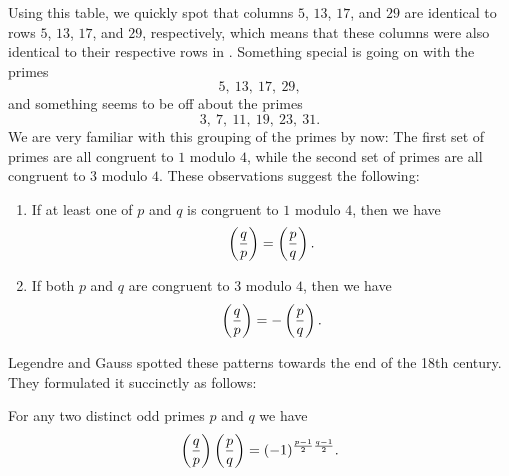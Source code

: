 Using this table, we quickly spot that columns $5$, $13$, $17$, and $29$ are identical to rows $5$, $13$, $17$, and $29$, respectively, which means that these columns were also identical to their respective rows in . Something special is going on with the primes
\begin{equation*}
  5,~13,~17,~29,
\end{equation*}
and something seems to be off about the primes
\begin{equation*}
  3,~7,~11,~19,~23,~31.
\end{equation*}
We are very familiar with this grouping of the primes by now: The first set of primes are all congruent to $1$ modulo $4$, while the second set of primes are all congruent to $3$ modulo $4$. These observations suggest the following:
\begin{enumerate}
\item If at least one of $p$ and $q$ is congruent to $1$ modulo $4$, then we have
  \begin{equation*}
    \legendre{q}{p}=\legendre{p}{q}.
  \end{equation*}
\item If both $p$ and $q$ are congruent to $3$ modulo $4$, then we have
  \begin{equation*}
    \legendre{q}{p}=-\legendre{p}{q}.
  \end{equation*}
\end{enumerate}
Legendre and Gauss spotted these patterns towards the end of the 18th century. They formulated it succinctly as follows:

\begin{theorem}\label{theorem:quadratic-reciprocity}
  For any two distinct odd primes $p$ and $q$ we have
  \begin{equation*}
    \legendre{q}{p}\legendre{p}{q}=(-1)^{\frac{p-1}{2}\frac{q-1}{2}}.
  \end{equation*}
\end{theorem}

